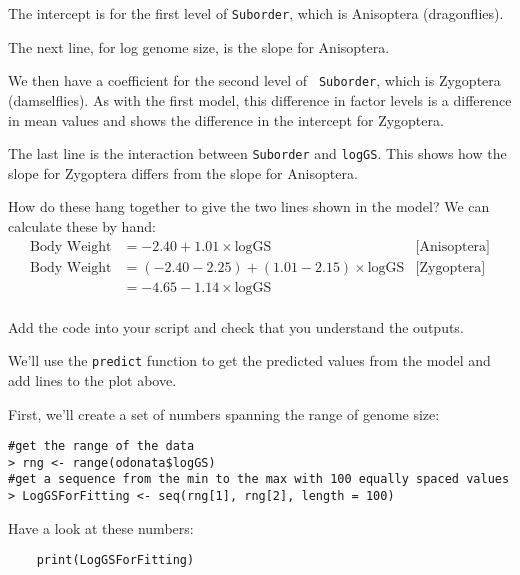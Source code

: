 \begin{compactitem}
	\item The intercept is for the first level of {\tt Suborder}, which 
	is Anisoptera (dragonflies).
	\item The next line, for log genome size, is the slope for Anisoptera.
	\item We then have a coefficient for  the second level of {\tt 
	Suborder}, which is Zygoptera (damselflies). As with the first model, 
	this difference in factor levels is a difference in mean values and 
	shows the difference in the intercept for Zygoptera. 
	\item The last line is the interaction between {\tt Suborder} and 
	{\tt logGS}. This shows how the slope for Zygoptera differs from the 
	slope for Anisoptera.
\end{compactitem}

How do these hang together to give the two lines shown in the model? We 
can calculate these by hand:
\begin{align*}
	\textrm{Body Weight} &= -2.40 + 1.01 \times \textrm{logGS} & \textrm{[Anisoptera]}\\
	\textrm{Body Weight} &= (-2.40 -2.25) + (1.01 - 2.15) \times \textrm{logGS} & \textrm{[Zygoptera]}\\
	                     &= -4.65 - 1.14 \times \textrm{logGS} \\
\end{align*}


\begin{compactitem}[$\quad\star$]
	\item Add the code into your script and check that you understand the 
	outputs.
\end{compactitem}

We'll use the {\tt predict} function to get the predicted values from 
the model and add lines to the plot above.

First, we'll create a set of numbers spanning the range of genome size:

\begin{lstlisting}	
#get the range of the data
> rng <- range(odonata$logGS)
#get a sequence from the min to the max with 100 equally spaced values
> LogGSForFitting <- seq(rng[1], rng[2], length = 100)
\end{lstlisting}
Have a look at these numbers:
 
\begin{lstlisting}	
	print(LogGSForFitting)
\end{lstlisting}
 
